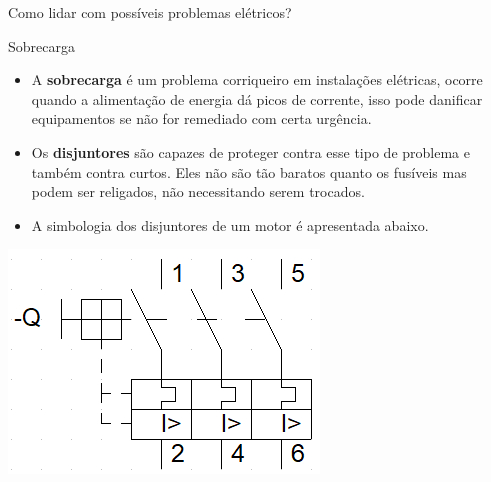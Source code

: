 \begin{frame}{Como lidar com possíveis problemas elétricos?}
	\begin{block}{Sobrecarga}
		\begin{itemize}
			\item A \textbf{sobrecarga} é um problema corriqueiro em instalações elétricas, ocorre quando a alimentação de energia dá picos de corrente, isso pode danificar equipamentos se não for remediado com certa urgência.
			\item Os \textbf{disjuntores} são capazes de proteger contra esse tipo de problema e também contra curtos. Eles não são tão baratos quanto os fusíveis mas podem ser religados, não necessitando serem trocados.
			\item A simbologia dos disjuntores de um motor é apresentada abaixo.
		\end{itemize}
	\end{block}
	\centerline{\includegraphics[height=0.3\textheight]{Figuras/Ch05/fig12.jpg}}
\end{frame}

